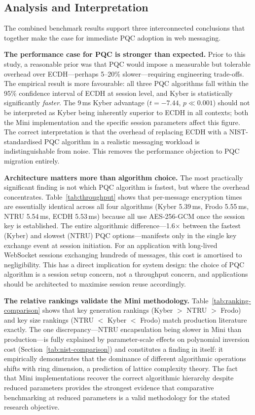 \documentclass[11pt,a4paper]{article}
\begin{document}
\subsection{Analysis and Interpretation}

The combined benchmark results support three interconnected conclusions that together make the case for immediate PQC adoption in web messaging.

\textbf{The performance case for PQC is stronger than expected.} Prior to this study, a reasonable prior was that PQC would impose a measurable but tolerable overhead over ECDH---perhaps 5--20\% slower---requiring engineering trade-offs. The empirical result is more favourable: all three PQC algorithms fall within the 95\% confidence interval of ECDH at session level, and Kyber is statistically significantly \emph{faster}. The 9\,ms Kyber advantage ($t=-7.44$, $p\ll0.001$) should not be interpreted as Kyber being inherently superior to ECDH in all contexts; both the Mini implementation and the specific session parameters affect this figure. The correct interpretation is that the overhead of replacing ECDH with a NIST-standardised PQC algorithm in a realistic messaging workload is indistinguishable from noise. This removes the performance objection to PQC migration entirely.

\textbf{Architecture matters more than algorithm choice.} The most practically significant finding is not which PQC algorithm is fastest, but where the overhead concentrates. Table~\ref{tab:throughput} shows that per-message encryption times are essentially identical across all four algorithms (Kyber 5.39\,ms, Frodo 5.55\,ms, NTRU 5.54\,ms, ECDH 5.53\,ms) because all use AES-256-GCM once the session key is established. The entire algorithmic difference---1.6$\times$ between the fastest (Kyber) and slowest (NTRU) PQC options---manifests only in the single key exchange event at session initiation. For an application with long-lived WebSocket sessions exchanging hundreds of messages, this cost is amortised to negligibility. This has a direct implication for system design: the choice of PQC algorithm is a session setup concern, not a throughput concern, and applications should be architected to maximise session reuse accordingly.

\textbf{The relative rankings validate the Mini methodology.} Table~\ref{tab:ranking-comparison} shows that key generation rankings (Kyber $>$ NTRU $>$ Frodo) and key size rankings (NTRU $<$ Kyber $<$ Frodo) match production literature exactly. The one discrepancy---NTRU encapsulation being slower in Mini than production---is fully explained by parameter-scale effects on polynomial inversion cost (Section~\ref{tab:nist-comparison}) and constitutes a finding in itself: it empirically demonstrates that the dominance of different algorithmic operations shifts with ring dimension, a prediction of lattice complexity theory. The fact that Mini implementations recover the correct algorithmic hierarchy despite reduced parameters provides the strongest evidence that comparative benchmarking at reduced parameters is a valid methodology for the stated research objective.
\end{document}
